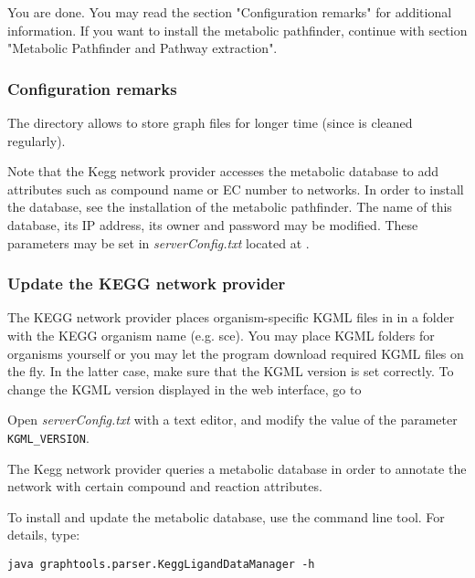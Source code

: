 \documentclass{book}
\begin{document}
You are done. You may read the section "Configuration remarks" for additional information.
If you want to install the metabolic pathfinder, continue with section "Metabolic Pathfinder and Pathway extraction".

\subsubsection{Configuration remarks}

The directory 
allows to store graph files for longer time
(since  is cleaned regularly).


Note that the Kegg network provider accesses the metabolic database to add attributes
such as compound name or EC number to networks.
In order to install the database, see the installation of the metabolic pathfinder.
The name of this database, its IP address, its owner and password may be modified.
These parameters may be set in \textit{serverConfig.txt}
located at .

\subsubsection{Update the KEGG network provider}

The KEGG network provider places organism-specific KGML files in 
in a folder with the KEGG organism name (e.g. sce).
You may place KGML folders for organisms yourself or you may let the program download
required KGML files on the fly. In the latter case, make sure that the KGML version is set correctly.
To change the KGML version displayed in the web interface,
go to 


Open \textit{serverConfig.txt} with a text editor, and modify the
value of the parameter \texttt{KGML\_VERSION}.


The Kegg network provider queries a metabolic database in order to
annotate the network with certain compound and reaction attributes.

To install and update the metabolic database, use the
 command line tool.  For details, type:

\begin{lstlisting}
java graphtools.parser.KeggLigandDataManager -h
\end{lstlisting}
\end{document}
